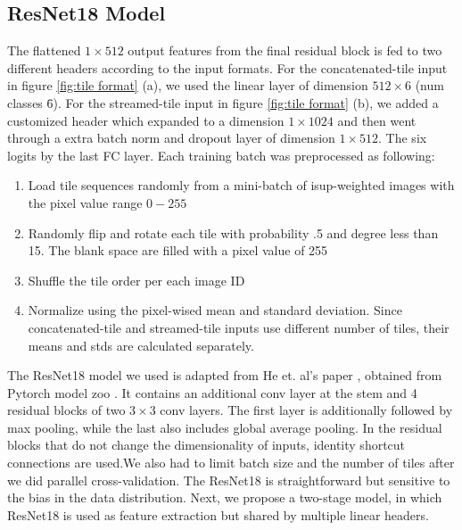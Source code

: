 \documentclass[10pt,twocolumn,letterpaper]{article}
\begin{document}
\subsection{ResNet18 Model}
The flattened $1 \times 512$ output features from the final residual block is fed to two different headers according to the input formats. For the concatenated-tile input in figure \ref{fig:tile format} (a), we used the linear layer of dimension $512 \times 6$ (num classes \= 6). For the streamed-tile input in figure \ref{fig:tile format} (b), we added a customized header which expanded to a dimension $1 \times 1024$ and then went through a extra batch norm and dropout layer of dimension $1 \times 512$. The six logits by the last FC layer. Each training batch was preprocessed as following:
\begin{enumerate}
    \item Load tile sequences randomly from a mini-batch of isup-weighted images with the pixel value range $0-255$
    \item Randomly flip and rotate each tile with probability .5 and degree less than 15. The blank space are filled with a pixel value of 255
    \item Shuffle the tile order per each image ID
    \item Normalize using the pixel-wised mean and standard deviation. Since concatenated-tile and streamed-tile inputs use different number of tiles, their means and stds are calculated separately. %
    
    
\end{enumerate}
The ResNet18 model\cite{resnetArch} we used is adapted from He et. al's paper \cite{HeXSJ.:1512.03385}, obtained from Pytorch model zoo . It contains an additional conv layer at the stem and 4 residual blocks of two $3 \times 3$ conv layers. The first layer is additionally followed by max pooling, while the last also includes global average pooling. In the residual blocks that do not change the dimensionality of inputs, identity shortcut connections are used.We also had to limit batch size and the number of tiles after we did parallel cross-validation.
The ResNet18 is straightforward but sensitive to the bias in the data distribution. Next, we propose a two-stage model, in which ResNet18 is used as feature extraction but shared by multiple linear headers.
\end{document}

